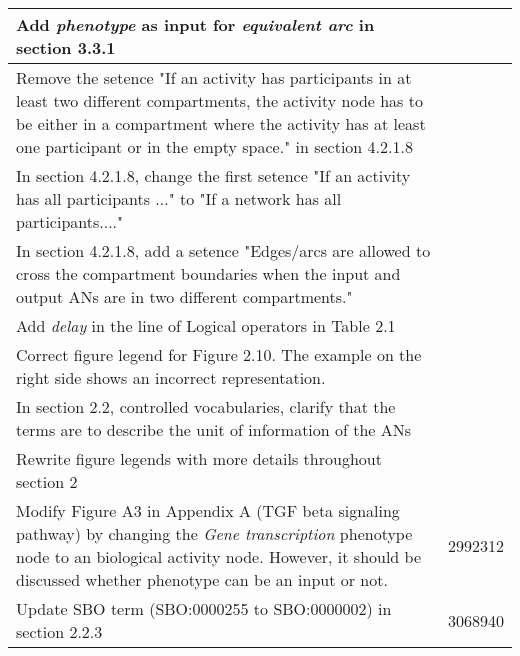 \begin{center}
\begin{supertabular}{|p{12cm}|c|}
Add \emph{phenotype} as input for \emph{equivalent arc} in section 3.3.1 & \\\hline
Remove the setence "If an activity has participants in at least two different compartments, the activity node has to be either in a compartment where the activity has at least one participant or in the empty space." in section 4.2.1.8 & \\\hline
In section 4.2.1.8, change the first setence "If an activity has all participants ..." to "If a network has all participants...." & \\\hline
In section 4.2.1.8, add a setence "Edges/arcs are allowed to cross the compartment boundaries when the input and output ANs are in two different compartments." & \\\hline
Add \emph{delay} in the line of Logical operators in Table 2.1 & \\\hline
Correct figure legend for Figure 2.10.  The example on the right side shows an incorrect representation. & \\\hline
In section 2.2, controlled vocabularies, clarify that the terms are to describe the unit of information of the ANs &
\\\hline
Rewrite figure legends with more details throughout section 2 &
\\\hline
Modify Figure A3 in Appendix A (TGF beta signaling pathway) by changing the \emph{Gene transcription} phenotype node to an biological activity node.  However, it should be discussed whether phenotype can be an input or not. & 2992312 \\\hline
Update SBO term (SBO:0000255 to SBO:0000002) in section 2.2.3  & 3068940 \\\hline
\end{supertabular}
\end{center}
